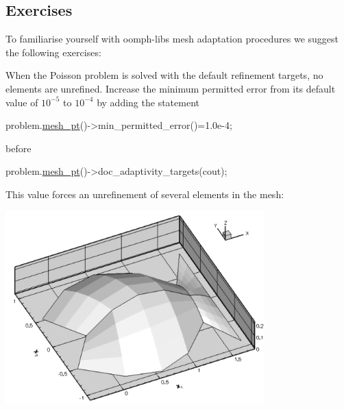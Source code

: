 \hypertarget{index_exercises}{}\subsection{Exercises}\label{index_exercises}
To familiarise yourself with {\ttfamily oomph-\/lib\textquotesingle{}s} mesh adaptation procedures we suggest the following exercises\+:
\begin{DoxyEnumerate}
\item When the Poisson problem is solved with the default refinement targets, no elements are unrefined. Increase the minimum permitted error from its default value of $ 10^{-5} $ to $ 10^{-4} $ by adding the statement 
\begin{DoxyCode}
problem.\hyperlink{classRefineableFishPoissonProblem_a803c9050b07b35aba22f08a5a9e59f2c}{mesh\_pt}()->min\_permitted\_error()=1.0e-4;
\end{DoxyCode}
 before 
\begin{DoxyCode}
problem.\hyperlink{classRefineableFishPoissonProblem_a803c9050b07b35aba22f08a5a9e59f2c}{mesh\_pt}()->doc\_adaptivity\_targets(cout);
\end{DoxyCode}
 This value forces an unrefinement of several elements in the mesh\+:  
\begin{DoxyImage}
\includegraphics[width=0.75\textwidth]{fish_poisson_soln2}
\end{DoxyImage}


\end{DoxyEnumerate}
